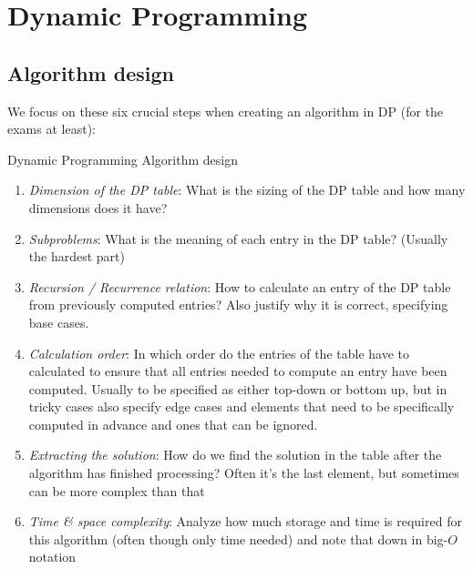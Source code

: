 \newsection
\section{Dynamic Programming}
\subsection{Algorithm design}
We focus on these six crucial steps when creating an algorithm in DP (for the exams at least):

\begin{usage}[]{Dynamic Programming Algorithm design}
    \begin{enumerate}[label=\Roman*]
        \item \textit{Dimension of the DP table}: What is the sizing of the DP table and how many dimensions does it have?
        \item \textit{Subproblems}: What is the meaning of each entry in the DP table? (Usually the hardest part)
        \item \textit{Recursion / Recurrence relation}: How to calculate an entry of the DP table from previously computed entries? Also justify why it is correct, specifying base cases.
        \item \textit{Calculation order}: In which order do the entries of the table have to calculated to ensure that all entries needed to compute an entry have been computed. Usually to be specified as either top-down or bottom up, but in tricky cases also specify edge cases and elements that need to be specifically computed in advance and ones that can be ignored.
        \item \textit{Extracting the solution}: How do we find the solution in the table after the algorithm has finished processing? Often it's the last element, but sometimes can be more complex than that
        \item \textit{Time \& space complexity}: Analyze how much storage and time is required for this algorithm (often though only time needed) and note that down in big-$O$ notation
    \end{enumerate}
\end{usage}




